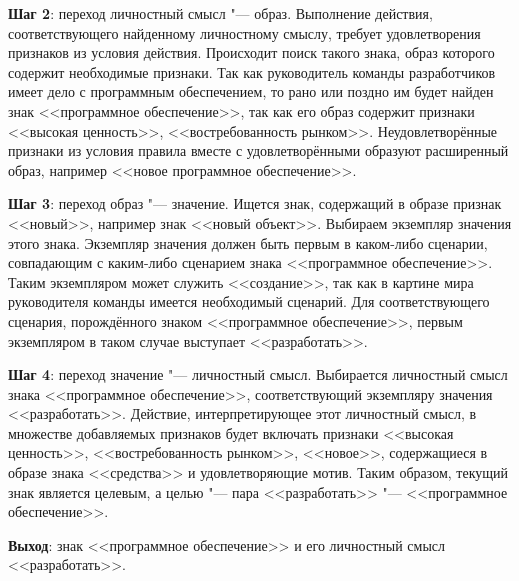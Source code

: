 \begin{appendices}
\textbf{Шаг 2}: переход личностный смысл "--- образ. Выполнение действия, соответствующего найденному личностному смыслу, требует удовлетворения признаков из условия действия. Происходит поиск такого знака, образ которого содержит необходимые признаки. Так как руководитель команды разработчиков имеет дело с программным обеспечением, то рано или поздно им будет найден знак <<программное обеспечение>>, так как его образ содержит признаки <<высокая ценность>>, <<востребованность рынком>>. Неудовлетворённые признаки из условия правила вместе с удовлетворёнными образуют расширенный образ, например <<новое программное обеспечение>>.

\textbf{Шаг 3}: переход образ "--- значение. Ищется знак, содержащий в образе признак <<новый>>, например знак <<новый объект>>. Выбираем экземпляр значения этого знака. Экземпляр значения должен быть первым в каком-либо сценарии, совпадающим с каким-либо сценарием знака <<программное обеспечение>>. Таким экземпляром может служить <<создание>>, так как в картине мира руководителя команды имеется необходимый сценарий. Для соответствующего сценария, порождённого знаком <<программное обеспечение>>, первым экземпляром в таком случае выступает <<разработать>>.

\textbf{Шаг 4}: переход значение "--- личностный смысл. Выбирается личностный смысл знака <<программное обеспечение>>, соответствующий экземпляру значения <<разработать>>. Действие, интерпретирующее этот личностный смысл, в множестве добавляемых признаков будет включать признаки <<высокая ценность>>, <<востребованность рынком>>, <<новое>>, содержащиеся в образе знака <<средства>> и удовлетворяющие мотив. Таким образом, текущий знак является целевым, а целью "--- пара <<разработать>> "--- <<программное обеспечение>>.

\textbf{Выход}: знак <<программное обеспечение>> и его личностный смысл <<разработать>>.
\end{appendices}